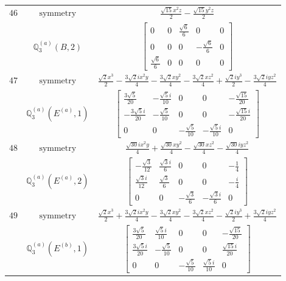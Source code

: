 \documentclass[fleqn,8pt,landscape]{jsarticle}
\begin{document}
\begin{longtable}{ccc}
$ 46 $ & $ \text{symmetry} $ & $ \frac{\sqrt{15} x^{2} z}{2} - \frac{\sqrt{15} y^{2} z}{2} $ \\
$  $ & $ \mathbb{Q}_{3}^{(a)}(B,2) $ & $ \begin{bmatrix} 0 & 0 & \frac{\sqrt{6}}{6} & 0 & 0 \\ 0 & 0 & 0 & - \frac{\sqrt{6}}{6} & 0 \\ \frac{\sqrt{6}}{6} & 0 & 0 & 0 & 0 \end{bmatrix} $ \\ \hline
$ 47 $ & $ \text{symmetry} $ & $ \frac{\sqrt{2} x^{3}}{2} - \frac{3 \sqrt{2} i x^{2} y}{4} - \frac{3 \sqrt{2} x y^{2}}{4} - \frac{3 \sqrt{2} x z^{2}}{4} + \frac{\sqrt{2} i y^{3}}{2} - \frac{3 \sqrt{2} i y z^{2}}{4} $ \\
$  $ & $ \mathbb{Q}_{3}^{(a)}(E^{(a)},1) $ & $ \begin{bmatrix} \frac{3 \sqrt{5}}{20} & - \frac{\sqrt{5} i}{10} & 0 & 0 & - \frac{\sqrt{15}}{20} \\ - \frac{3 \sqrt{5} i}{20} & - \frac{\sqrt{5}}{10} & 0 & 0 & - \frac{\sqrt{15} i}{20} \\ 0 & 0 & - \frac{\sqrt{5}}{10} & - \frac{\sqrt{5} i}{10} & 0 \end{bmatrix} $ \\ \hline
$ 48 $ & $ \text{symmetry} $ & $ \frac{\sqrt{30} i x^{2} y}{4} + \frac{\sqrt{30} x y^{2}}{4} - \frac{\sqrt{30} x z^{2}}{4} - \frac{\sqrt{30} i y z^{2}}{4} $ \\
$  $ & $ \mathbb{Q}_{3}^{(a)}(E^{(a)},2) $ & $ \begin{bmatrix} - \frac{\sqrt{3}}{12} & \frac{\sqrt{3} i}{6} & 0 & 0 & - \frac{1}{4} \\ \frac{\sqrt{3} i}{12} & \frac{\sqrt{3}}{6} & 0 & 0 & - \frac{i}{4} \\ 0 & 0 & - \frac{\sqrt{3}}{6} & - \frac{\sqrt{3} i}{6} & 0 \end{bmatrix} $ \\ \hline
$ 49 $ & $ \text{symmetry} $ & $ \frac{\sqrt{2} x^{3}}{2} + \frac{3 \sqrt{2} i x^{2} y}{4} - \frac{3 \sqrt{2} x y^{2}}{4} - \frac{3 \sqrt{2} x z^{2}}{4} - \frac{\sqrt{2} i y^{3}}{2} + \frac{3 \sqrt{2} i y z^{2}}{4} $ \\
$  $ & $ \mathbb{Q}_{3}^{(a)}(E^{(b)},1) $ & $ \begin{bmatrix} \frac{3 \sqrt{5}}{20} & \frac{\sqrt{5} i}{10} & 0 & 0 & - \frac{\sqrt{15}}{20} \\ \frac{3 \sqrt{5} i}{20} & - \frac{\sqrt{5}}{10} & 0 & 0 & \frac{\sqrt{15} i}{20} \\ 0 & 0 & - \frac{\sqrt{5}}{10} & \frac{\sqrt{5} i}{10} & 0 \end{bmatrix} $ \\ \hline

\end{longtable}
\end{document}
